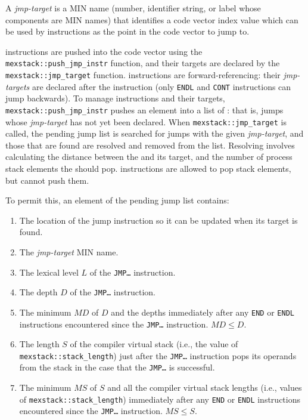 \documentclass[12pt]{article}
\begin{document}
A {\em jmp-target} is a MIN name (number, identifier string, or
label whose components are MIN names) that identifies
a code vector index value which can be used by 
instructions as the point in the code vector to jump to.

 instructions are pushed into the code vector
using the {\tt mexstack::push\_jmp\_instr} function, and their targets are
declared by the {\tt mexstack::jmp\_target} function.
 instructions are forward-referencing: their
{\em jmp-targets} are declared after the  instruction
(only {\tt ENDL} and {\tt CONT} instructions can jump backwards).
To manage  instructions and their targets,
{\tt mexstack::push\_jmp\_instr}
pushes an element into a list of :
that is, jumps whose {\em jmp-target} has not yet been
declared.  When {\tt mexstack::jmp\_target} is called,
the pending jump list is searched for jumps with the given
{\em jmp-target},
and those that are found are resolved and removed from
the list.  Resolving involves calculating the distance
between the  and its target, and the number of
process stack elements the  should pop.
 instructions
are allowed to pop stack elements, but cannot push them.

To permit this, an element of the pending jump list%
\label{PENDING-JUMP-LIST}
contains:
\begin{enumerate}
\item The location of the jump instruction so it can be updated
when its target is found.
\item The {\em jmp-target} MIN name.
\item The lexical level $L$ of the {\tt JMP\ldots} instruction.
\item The depth $D$ of the {\tt JMP\ldots} instruction.
\item The minimum $MD$ of $D$ and
      the depths immediately after any {\tt END} or {\tt ENDL} instructions
      encountered since the {\tt JMP\ldots} instruction.
      $MD\le D$.
\item The length $S$ of the compiler virtual stack (i.e., the value of
      {\tt mexstack::stack\_length}) just after the {\tt JMP\ldots}
      instruction pops its operands from the stack in the case that
      the {\tt JMP\ldots} is successful.
\item The minimum $MS$ of $S$ and all the compiler virtual stack lengths
      (i.e., values of {\tt mexstack::stack\_length}) immediately
      after any {\tt END} or {\tt ENDL} instructions encountered
      since the {\tt JMP\ldots} instruction.
      $MS\le S$.
\end{enumerate}
\end{document}
